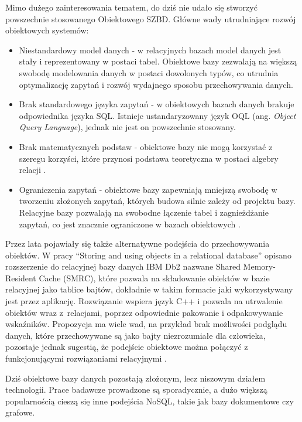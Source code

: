 \documentclass[a4paper,twoside,12pt]{book}
\begin{document}
Mimo dużego zainteresowania tematem, do dziś nie udało się stworzyć powszechnie stosowanego Obiektowego SZBD. Główne wady utrudniające rozwój obiektowych systemów:
\begin{itemize}
    \item Niestandardowy model danych - w relacyjnych bazach model danych jest stały i reprezentowany w postaci tabel. Obiektowe bazy zezwalają na większą swobodę modelowania danych w postaci dowolonych typów, co utrudnia optymalizację zapytań i rozwój wydajnego sposobu przechowywania danych.
    \item Brak standardowego języka zapytań - w obiektowych bazach danych brakuje odpowiednika języka SQL. Istnieje ustandaryzowany język OQL (ang. \textit{Object Query Language}), jednak nie jest on powszechnie stosowany.
    \item Brak matematycznych podstaw - obiektowe bazy nie mogą korzystać z szeregu korzyści, które przynosi podstawa teoretyczna w postaci algebry relacji \cite{bib:comparison-analysis-of-object-and-or-databases}.
    \item Ograniczenia zapytań - obiektowe bazy zapewniają mniejszą swobodę w tworzeniu złożonych zapytań, których budowa silnie zależy od projektu bazy. Relacyjne bazy pozwalają na swobodne łączenie tabel i zagnieżdżanie zapytań, co jest znacznie ograniczone w bazach obiektowych \cite{bib:evolution-odbs}.
\end{itemize}

Przez lata pojawiały się także alternatywne podejścia do przechowywania obiektów. W pracy ``Storing and using objects in a relational database'' opisano rozszerzenie do relacyjnej bazy danych IBM Db2 nazwane Shared Memory-Resident Cache (SMRC), które pozwala na składowanie obiektów w bazie relacyjnej jako tablice bajtów, dokładnie w takim formacie jaki wykorzystywany jest przez aplikację. Rozwiązanie wspiera język C++ i pozwala na utrwalenie obiektów wraz z~relacjami, poprzez odpowiednie pakowanie i odpakowywanie wskaźników. Propozycja ma wiele wad, na przykład brak możliwości podglądu danych, które przechowywane są jako bajty niezrozumiałe dla człowieka, pozostaje jednak sugestią, że podejście obiektowe można połączyć z funkcjonującymi rozwiązaniami relacyjnymi \cite{bib:storing-and-using-objects}.

Dziś obiektowe bazy danych pozostają złożonym, lecz niszowym działem technologii. Prace badawcze prowadzone są sporadycznie, a dużo większą popularnością cieszą się inne podejścia NoSQL, takie jak bazy dokumentowe czy grafowe.
\end{document}
